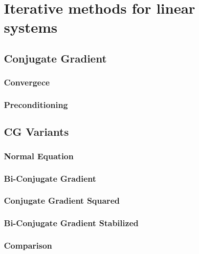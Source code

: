 \section{Iterative methods for linear systems}


\subsection{Conjugate Gradient}


\subsubsection{Convergece}\label{sec: CG Convergens} %


\newpage
\subsubsection{Preconditioning}\label{sec: prelim precond}


\subsection{CG Variants} 
   

\subsubsection{Normal Equation}


\subsubsection{Bi-Conjugate Gradient}

\subsubsection{Conjugate Gradient Squared}


\subsubsection{Bi-Conjugate Gradient Stabilized}\label{sec: BiCGStab}


\subsubsection{Comparison}\label{sec: prelim compar}
